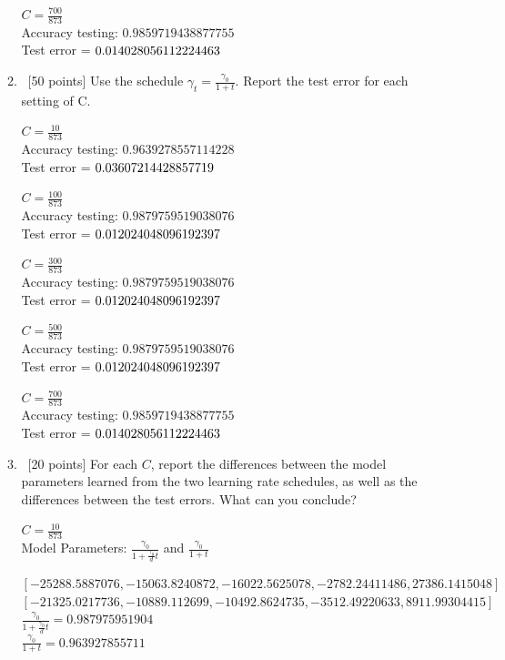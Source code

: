 \documentclass[12pt, fullpage,letterpaper]{article}
\begin{document}
\begin{enumerate}
\begin{enumerate}
$C = \frac{700}{873}$\\
Accuracy testing: $0.9859719438877755$\\
Test error = $0.014028056112224463\\ $


\item~[50 points] Use the schedule $\gamma_t = \frac{\gamma_0}{1+t}$. Report the test error for each setting of C.

$C = \frac{10}{873}$\\
Accuracy testing: $0.9639278557114228$\\
Test error = $0.03607214428857719\\ $


$C = \frac{100}{873}$\\
Accuracy testing: $0.9879759519038076$\\
Test error = $0.012024048096192397\\ $


$C = \frac{300}{873}$\\
Accuracy testing: $0.9879759519038076$\\
Test error = $0.012024048096192397\\ $


$C = \frac{500}{873}$\\
Accuracy testing: $0.9879759519038076$\\
Test error = $0.012024048096192397\\ $


$C = \frac{700}{873}$\\
Accuracy testing: $0.9859719438877755$\\
Test error = $0.014028056112224463\\ $

\item~[20 points] For each $C$, report the differences between the model parameters learned from the two learning rate schedules, as well as the differences between the test errors. What can you conclude?


$C = \frac{10}{873}$\\
Model Parameters: $\frac{\gamma_0}{1+\frac{\gamma_0}{d}t}$ and
$\frac{\gamma_0}{1+t}$

$[-25288.5887076, -15063.8240872, -16022.5625078, -2782.24411486, 27386.1415048]$\\
$[-21325.0217736, -10889.112699, -10492.8624735, -3512.49220633, 8911.99304415]$\\

$\frac{\gamma_0}{1+\frac{\gamma_0}{d}t} = 0.987975951904$\\
$\frac{\gamma_0}{1+t} = 0.963927855711$\\


\end{enumerate}
\end{enumerate}
\end{document}
